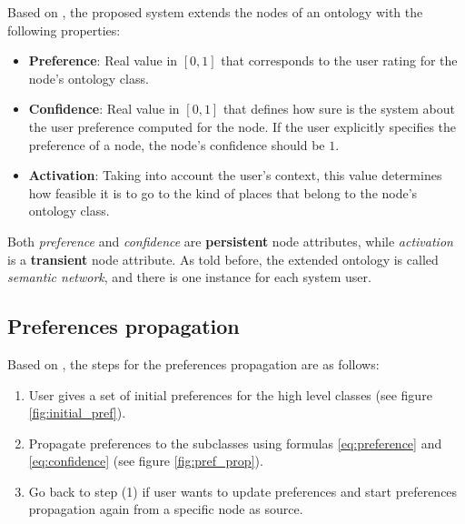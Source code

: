 Based on \cite{bahramian_abbaspour_claramunt_2017}, the proposed system extends the nodes of an ontology with the following properties:
\begin{itemize}
    \item \textbf{Preference}: Real value in $[0, 1]$ that corresponds to the user rating for the node's ontology class.
    \item \textbf{Confidence}: Real value in $[0, 1]$ that defines how sure is the system about the user preference computed for the node. If the user explicitly specifies the preference of a node, the node's confidence should be $1$.
    \item \textbf{Activation}: Taking into account the user's context, this value determines how feasible it is to go to the kind of places that belong to the node's ontology class.
\end{itemize}{}
Both \textit{preference} and \textit{confidence} are \textbf{persistent} node attributes, while \textit{activation} is a \textbf{transient} node attribute. As told before, the extended ontology is called \textit{semantic network}, and there is one instance for each system user.
 
\subsection{Preferences propagation} \label{section:preferences-propagation}
Based on \cite{bahramian_abbaspour_claramunt_2017}, the steps for the preferences propagation are as follows:
\begin{enumerate}
    \item User gives a set of initial preferences for the high level classes (see figure \ref{fig:initial_pref}).
    
    \item Propagate preferences to the subclasses using formulas \ref{eq:preference} and \ref{eq:confidence} (see figure \ref{fig:pref_prop}).
    
    \item Go back to step (1) if user wants to update preferences and start preferences propagation again from a specific node as source.
\end{enumerate}

